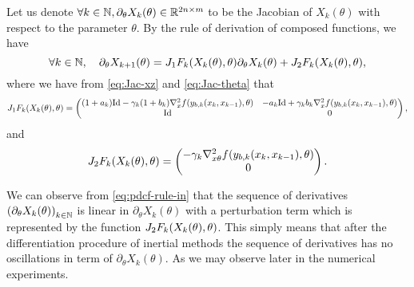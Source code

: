 Let us denote  $\forall k\in\mathbb{N}, \partial_{\theta}X_k(\theta)\in \mathbb{R}^{2n\times m}$  to be  the Jacobian of $X_k(\theta)$ with respect to the parameter $\theta$. By the rule of derivation of composed functions, we have 
\begin{equation}\label{eq:pdcf-rule-in}
 \forall k\in\mathbb{N}, \quad \partial_{\theta}X_{k+1}(\theta)=J_1F_k(X_k(\theta),\theta)\partial_{\theta}X_k(\theta)+J_2F_k(X_k(\theta),\theta),
\end{equation}
where we have from \eqref{eq:Jac-xz} and \eqref{eq:Jac-theta} that 
\[
	 	J_1F_k(X_k(\theta),\theta)= \begin{pmatrix} (1+a_{k})\mathrm{Id}-\gamma_{k}(1+b_{k})\nabla_x^2f(y_{b,k}(x_{k},x_{k-1}),\theta) &-a_{k}\mathrm{Id}+\gamma_{k}b_{k}\nabla_x^2f(y_{b,k}(x_{k},x_{k-1}),\theta) \\ \mathrm{Id}  & 
		0\end{pmatrix},
\]
and 
\[
		 	J_2F_k(X_k(\theta),\theta)= \begin{pmatrix} -\gamma_{k}\nabla_{x\theta}^2f(y_{b,k}(x_{k},x_{k-1}),\theta)  \\  
		0\end{pmatrix}.
\]

\begin{remark}\label{rmk:inert-deriv}
 We  can observe from \eqref{eq:pdcf-rule-in} that the sequence of derivatives $\left(\partial_{\theta}X_{k}(\theta)\right)_{k\in\mathbb{N}}$ is linear in $\partial_{\theta}X_{k}(\theta)$ with a perturbation  term which is represented by the function  $J_2F_k(X_k(\theta),\theta)$. This simply  means  that  after  the differentiation  procedure of  inertial methods  the sequence of derivatives has no oscillations in term of $\partial_{\theta}X_{k}(\theta)$. As we may observe later in the numerical experiments. 
\end{remark}




